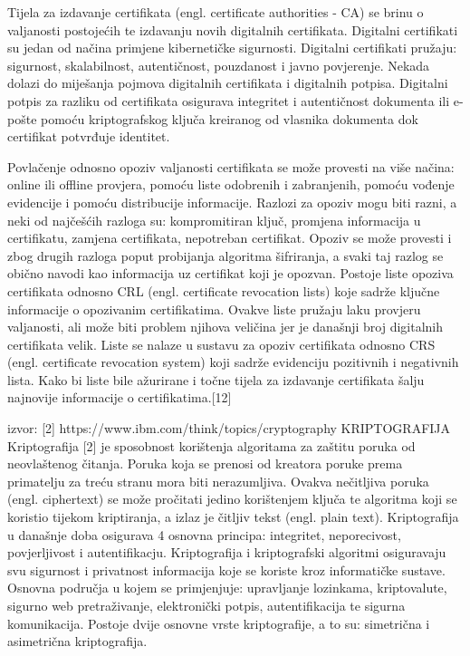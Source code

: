 \documentclass[]{foi}
\begin{document}
Tijela za izdavanje certifikata (engl. certificate authorities - CA) se brinu o valjanosti postojećih te izdavanju novih digitalnih certifikata. 
Digitalni certifikati su jedan od načina primjene kibernetičke sigurnosti. 
Digitalni certifikati pružaju: sigurnost, skalabilnost, autentičnost, pouzdanost i javno povjerenje.
Nekada dolazi do miješanja pojmova digitalnih certifikata i digitalnih potpisa.
Digitalni potpis za razliku od certifikata osigurava integritet i autentičnost dokumenta ili e-pošte pomoću kriptografskog ključa kreiranog od vlasnika dokumenta dok certifikat potvrđuje identitet. 

Povlačenje odnosno opoziv valjanosti certifikata se može provesti na više načina: online ili offline provjera, pomoću liste odobrenih i zabranjenih, pomoću vođenje evidencije i pomoću distribucije informacije.
Razlozi za opoziv mogu biti razni, a neki od najčešćih razloga su: kompromitiran ključ, promjena informacija u certifikatu, zamjena certifikata, nepotreban certifikat. 
Opoziv se može provesti i zbog drugih razloga poput probijanja algoritma šifriranja, a svaki taj razlog se obično navodi kao informacija uz certifikat koji je opozvan.
Postoje liste opoziva certifikata odnosno CRL (engl. certificate revocation lists) koje sadrže ključne informacije o opozivanim certifikatima.
Ovakve liste pružaju laku provjeru valjanosti, ali može biti problem njihova veličina jer je današnji broj digitalnih certifikata velik.
Liste se nalaze u sustavu za opoziv certifikata odnosno CRS (engl. certificate revocation system) koji sadrže evidenciju pozitivnih i negativnih lista.
Kako bi liste bile ažurirane i točne tijela za izdavanje certifikata šalju najnovije informacije o certifikatima.[12]   

izvor: [2] https://www.ibm.com/think/topics/cryptography
KRIPTOGRAFIJA
Kriptografija [2] je sposobnost korištenja algoritama za zaštitu poruka od neovlaštenog čitanja. 
Poruka koja se prenosi od kreatora poruke prema primatelju za treću stranu mora biti nerazumljiva.
Ovakva nečitljiva poruka (engl. ciphertext) se može pročitati jedino korištenjem ključa te algoritma koji se koristio tijekom kriptiranja, a izlaz je čitljiv tekst (engl. plain text).
Kriptografija u današnje doba osigurava 4 osnovna principa: integritet, neporecivost, povjerljivost i autentifikacju.
Kriptografija i kriptografski algoritmi osiguravaju svu sigurnost i privatnost informacija koje se koriste kroz informatičke sustave. 
Osnovna područja u kojem se primjenjuje: upravljanje lozinkama, kriptovalute, sigurno web pretraživanje, elektronički potpis, autentifikacija te sigurna komunikacija.
Postoje dvije osnovne vrste kriptografije, a to su: simetrična i asimetrična kriptografija. 
\end{document}

